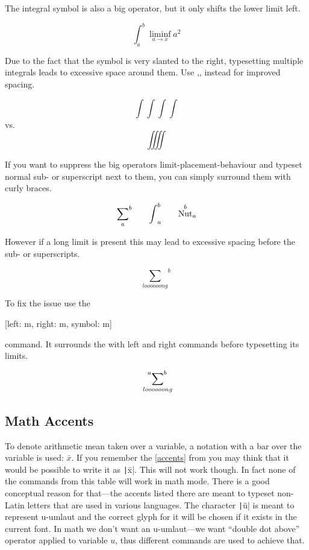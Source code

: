 The integral symbol is also a big operator, but it only shifts the lower limit
left.
\begin{example}
\[
  \int_a^b \liminf_{a \to x} a^2
\]
\end{example}
Due to the fact that the symbol is very slanted to the right, typesetting
multiple integrals leads to excessive space around them. Use
,, instead for improved spacing.
\begin{example}
\[ \int\int\int\int \]
vs.\ 
\[ \iiiint \]
\end{example}

If you want to suppress the big operators limit-placement-behaviour and typeset
normal sub- or superscript next to them, you can simply surround them with curly
braces.
\begin{example}
\[
  {\sum_{a}}^b
  \qquad%
  {\int}_a^b
  \qquad%
  {\nut^b}_a
\]
\end{example}
However if a long limit is present this may lead to excessive spacing
before the sub- or superscripts.
\begin{example}
\[ {\sum_{loooooong}}^{b} \]
\end{example}
To fix the issue use the
\begin{lscommand}
  [left: m, right: m, symbol: m]
\end{lscommand}
command. It surrounds the  with left and right commands before
typesetting its limits.
\begin{example}[vertical_mode, examplewidth=0.7\linewidth]
\[ \sideset{^{a}}{^{b}}{\sum}_{loooooong} \]
\end{example}

\subsection{Math Accents}\label{sec:math_accents}

To denote arithmetic mean taken over a variable, a notation with a bar over the
variable is used: \(\bar x\). If you remember the \autoref{accents} from
\autopageref{accents} you may think that it would be possible to write it as
\texttt|\=x|. This will not work though. In fact none of the
commands from this table will work in math mode. There is a good conceptual
reason for that---the accents listed there are meant to typeset non-Latin
letters that are used in various languages. The character
\texttt|\"u| is meant to represent u-umlaut and the correct glyph
for it will be chosen if it exists in the current font. In math we don't want
an u-umlaut---we want \enquote{double dot above} operator applied to variable
\(u\), thus different commands are used to achieve that.

